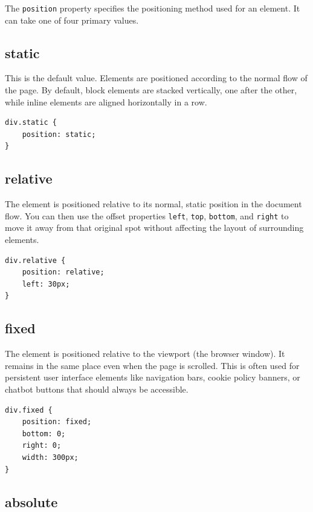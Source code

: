 \documentclass{scrbook}
\begin{document}
The \texttt{position} property specifies the positioning method used for an element. It can take one of four primary values. \\

\subsection{static}

This is the default value. Elements are positioned according to the normal flow of the page. By default, block elements are stacked vertically, one after the other, while inline elements are aligned horizontally in a row.

\begin{lstlisting}
div.static { 
    position: static; 
}
\end{lstlisting}

\subsection{relative}

The element is positioned relative to its normal, static position in the document flow. You can then use the offset properties \texttt{left}, \texttt{top}, \texttt{bottom}, and \texttt{right} to move it away from that original spot without affecting the layout of surrounding elements.

\begin{lstlisting}
div.relative { 
    position: relative; 
    left: 30px; 
}
\end{lstlisting}

\subsection{fixed}

The element is positioned relative to the viewport (the browser window). It remains in the same place even when the page is scrolled. This is often used for persistent user interface elements like navigation bars, cookie policy banners, or chatbot buttons that should always be accessible.

\begin{lstlisting}
div.fixed { 
    position: fixed; 
    bottom: 0; 
    right: 0; 
    width: 300px; 
}
\end{lstlisting}

\subsection{absolute}
\end{document}
